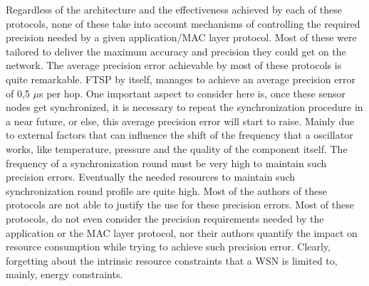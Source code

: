 Regardless of the architecture and the effectiveness achieved by each of these protocols, none of these take into account
mechanisms of controlling the required precision needed by a given application/MAC layer protocol. Most of these were tailored to deliver the maximum accuracy and precision they could get on the network. The average precision error achievable by most of these protocols is quite remarkable. FTSP by itself, manages to achieve an average precision error of 0,5 $\mu$s per hop. One important aspect to consider here is, once these sensor nodes get synchronized, it is necessary to repeat the synchronization procedure in a near future, or else, this average precision error will start to raise. Mainly due to external factors that can influence the shift of the frequency that a oscillator works, like temperature, pressure and the quality of the component itself. The frequency of a synchronization round must be very high to maintain such precision errors. Eventually the needed resources to maintain such synchronization round profile are quite high. Most of the authors of these protocols are not able to justify the use for these precision errors. Most of these protocols, do not even consider the precision requirements needed by the application or the MAC layer protocol, nor their authors quantify the impact on resource consumption while trying to achieve such precision error. Clearly, forgetting about the intrinsic resource constraints that a WSN is limited to, mainly, energy constraints.